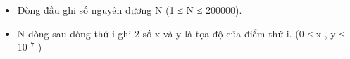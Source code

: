 \begin{itemize}
	\item Dòng đầu ghi số nguyên dương N (1 ≤ N ≤ 200000).
	\item N dòng sau dòng thứ i ghi 2 số x và y là tọa độ của điểm thứ i. (0 ≤ x , y ≤ 10 $^ 7 $ )
\end{itemize}